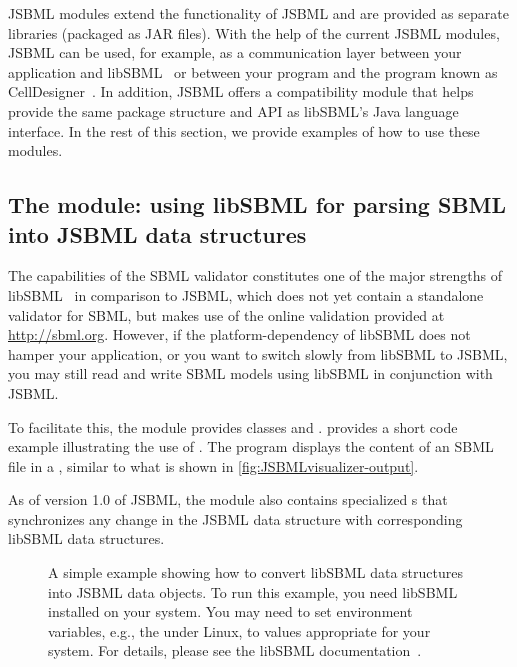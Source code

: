 JSBML modules extend the functionality of JSBML and are provided as
separate libraries (packaged as JAR files). With the help of the current
JSBML modules, JSBML can be used, for example, as a communication layer
 between your application and
libSBML~\citep{Bornstein2008} or between your program and the program known
as CellDesigner~\citep{Funahashi2003}. In addition, JSBML offers a
compatibility module %
that helps provide the same package structure and API as libSBML's Java
language interface. In the rest of this section, we provide examples of how
to use these modules.


\subsection{The  module: using libSBML for parsing
  SBML into JSBML data structures}

The capabilities of the SBML validator constitutes one
of the major strengths of libSBML~\citep{Bornstein2008} in comparison to
JSBML, which does not yet contain a standalone validator for SBML, but makes
use of the online validation provided at \url{http://sbml.org}. However, if
the platform-dependency of libSBML does not hamper your application, or you
want to switch slowly from libSBML to JSBML, you may still read and write
SBML models using libSBML in conjunction with JSBML.

To facilitate this, the module  provides classes
\LibSBMLReader and \LibSBMLWriter.   provides a short
code example illustrating the use of \LibSBMLReader.  The program displays the
content of an SBML file in a \JTree, similar to what is shown in
\vref{fig:JSBMLvisualizer-output}.

As of version 1.0 of JSBML, the  module also contains
specialized \TreeNodeChangeListener{}s that synchronizes any change in the
JSBML data structure with corresponding libSBML data structures.

\begin{figure}[htb]
  \caption{A simple example showing how to convert libSBML data structures
    into JSBML data objects.  To run this example, you need libSBML
    installed on your system.  You may need to set environment variables,
    e.g., the 
    under Linux, to values appropriate for your
    system. For details, please see the libSBML
    documentation~\cite{libSBMLwebsite}.}
  \label{lst:LibSBMLio}
\end{figure}


